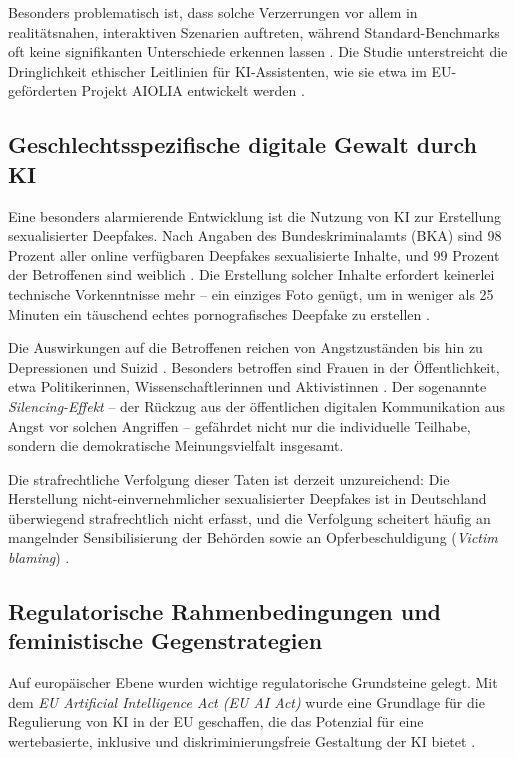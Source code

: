 \documentclass[12pt,a4paper]{article}
\begin{document}
	Besonders problematisch ist, dass solche Verzerrungen vor allem in realitätsnahen, interaktiven Szenarien auftreten, während Standard-Benchmarks oft keine signifikanten Unterschiede erkennen lassen \cite{thws_gehaltsbias}. Die Studie unterstreicht die Dringlichkeit ethischer Leitlinien für KI-Assistenten, wie sie etwa im EU-geförderten Projekt AIOLIA entwickelt werden \cite{thws_gehaltsbias_pm}.
	
	\subsection{Geschlechtsspezifische digitale Gewalt durch KI}
	
	Eine besonders alarmierende Entwicklung ist die Nutzung von KI zur Erstellung sexualisierter Deepfakes. Nach Angaben des Bundeskriminalamts (BKA) sind 98 Prozent aller online verfügbaren Deepfakes sexualisierte Inhalte, und 99 Prozent der Betroffenen sind weiblich \cite{bka_deepfakes}. Die Erstellung solcher Inhalte erfordert keinerlei technische Vorkenntnisse mehr – ein einziges Foto genügt, um in weniger als 25 Minuten ein täuschend echtes pornografisches Deepfake zu erstellen \cite{messer_deepfake}.
	
	Die Auswirkungen auf die Betroffenen reichen von Angstzuständen bis hin zu Depressionen und Suizid \cite{bka_deepfakes}. Besonders betroffen sind Frauen in der Öffentlichkeit, etwa Politikerinnen, Wissenschaftlerinnen und Aktivistinnen \cite{bka_deepfakes}. Der sogenannte \textit{Silencing-Effekt} – der Rückzug aus der öffentlichen digitalen Kommunikation aus Angst vor solchen Angriffen – gefährdet nicht nur die individuelle Teilhabe, sondern die demokratische Meinungsvielfalt insgesamt.
	
	Die strafrechtliche Verfolgung dieser Taten ist derzeit unzureichend: Die Herstellung nicht-einvernehmlicher sexualisierter Deepfakes ist in Deutschland überwiegend strafrechtlich nicht erfasst, und die Verfolgung scheitert häufig an mangelnder Sensibilisierung der Behörden sowie an Opferbeschuldigung (\textit{Victim blaming}) \cite{bka_deepfakes}.
	
	\subsection{Regulatorische Rahmenbedingungen und feministische Gegenstrategien}
	
	Auf europäischer Ebene wurden wichtige regulatorische Grundsteine gelegt. Mit dem \textit{EU Artificial Intelligence Act (EU AI Act)} wurde eine Grundlage für die Regulierung von KI in der EU geschaffen, die das Potenzial für eine wertebasierte, inklusive und diskriminierungsfreie Gestaltung der KI bietet \cite{eu_ai_act_frauenrat}.
	
\end{document}
